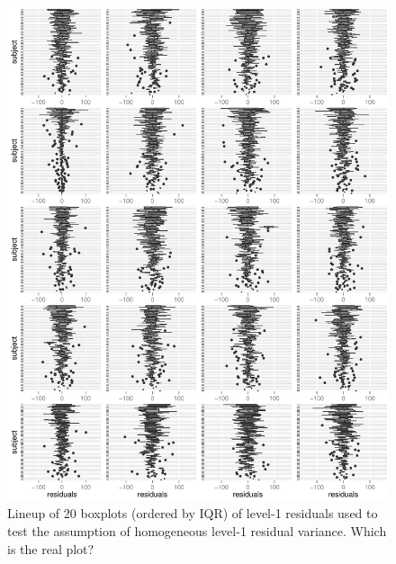 \documentclass{article} %
\begin{document}
\begin{figure}
	\centering
	\includegraphics[width=\textwidth]{ahd_badcyclone5.pdf}
	\caption{\label{fig:badcyclone} Lineup of 20 boxplots (ordered by IQR) of level-1 residuals used to test the assumption of homogeneous level-1 residual variance.  Which is the real plot?}
\end{figure}
\end{document}
